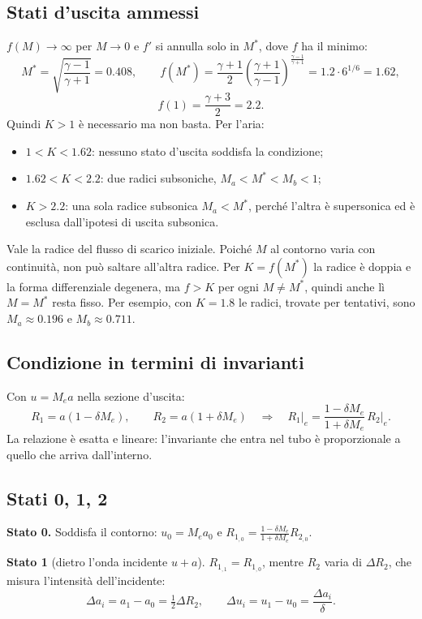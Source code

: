 \documentclass[11pt,a4paper]{article}
\newcommand{\upa}{u+a}
\newcommand{\Ru}{R_1}
\newcommand{\Rd}{R_2}
\newcommand{\Me}{M_e}
\newcommand{\Mst}{M^{*}}
\begin{document}
\subsection{Stati d'uscita ammessi}\label{sec:fM}
$f(M)\to\infty$ per $M\to0$ e $f'$ si annulla solo in $\Mst$, dove $f$ ha il minimo:
\[
  \Mst=\sqrt{\frac{\gamma-1}{\gamma+1}}=\num{0.408},\qquad
  f(\Mst)=\frac{\gamma+1}{2}\left(\frac{\gamma+1}{\gamma-1}\right)^{\frac{\gamma-1}{\gamma+1}}
  =\num{1.2}\cdot 6^{1/6}=\num{1.62},
\]
\[
  f(1)=\frac{\gamma+3}{2}=\num{2.2}.
\]
Quindi $K>1$ è necessario ma non basta. Per l'aria:
\begin{itemize}
  \item $1<K<\num{1.62}$: nessuno stato d'uscita soddisfa la condizione;
  \item $\num{1.62}<K<\num{2.2}$: due radici subsoniche, $M_a<\Mst<M_b<1$;
  \item $K>\num{2.2}$: una sola radice subsonica $M_a<\Mst$, perché l'altra è supersonica ed è esclusa
    dall'ipotesi di uscita subsonica.
\end{itemize}
Vale la radice del flusso di scarico iniziale. Poiché $M$ al contorno varia con continuità, non può saltare
all'altra radice. Per $K=f(\Mst)$ la radice è doppia e la forma differenziale degenera, ma $f>K$ per ogni
$M\neq\Mst$, quindi anche lì $M=\Mst$ resta fisso. Per esempio, con $K=\num{1.8}$ le radici, trovate per
tentativi, sono $M_a\approx\num{0.196}$ e $M_b\approx\num{0.711}$.

\subsection{Condizione in termini di invarianti}
Con $u=\Me a$ nella sezione d'uscita:
\[
  \Ru=a(1-\delta\Me),\qquad \Rd=a(1+\delta\Me)
  \quad\Rightarrow\quad
  \Ru\big|_{e}=\frac{1-\delta\Me}{1+\delta\Me}\,\Rd\big|_{e}.
\]
La relazione è esatta e lineare: l'invariante che entra nel tubo è proporzionale a quello che arriva
dall'interno.

\subsection{Stati 0, 1, 2}
\textbf{Stato 0.} Soddisfa il contorno: $u_0=\Me a_0$ e $\Ru_{,0}=\frac{1-\delta\Me}{1+\delta\Me}\Rd_{,0}$.

\textbf{Stato 1} (dietro l'onda incidente $\upa$). $\Ru_{,1}=\Ru_{,0}$, mentre $\Rd$ varia di $\Delta\Rd$, che
misura l'intensità dell'incidente:
\[
  \Delta a_i=a_1-a_0=\tfrac12\Delta\Rd,\qquad \Delta u_i=u_1-u_0=\frac{\Delta a_i}{\delta}.
\]
\end{document}
